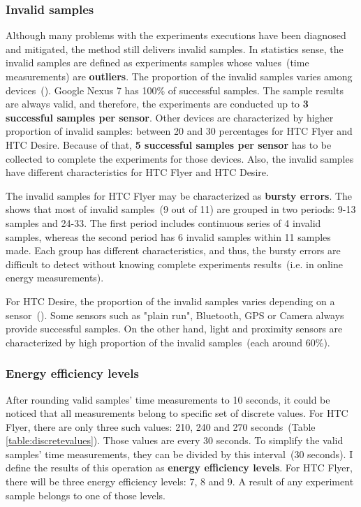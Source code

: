 \subsubsection{Invalid samples}
\hspace{10pt} Although many problems with the experiments executions have been diagnosed and mitigated, the method still delivers invalid samples. In statistics sense, the invalid samples are defined as experiments samples whose values\ (time measurements) are \textbf{outliers}.  The proportion of the invalid samples varies among devices\ (). Google Nexus 7 has 100\% of successful samples. The sample results are always valid, and therefore, the experiments are conducted up to \textbf{3 successful samples per sensor}. Other devices are characterized by higher proportion of invalid samples: between 20 and 30 percentages for HTC Flyer and HTC Desire. Because of that, \textbf{5 successful samples per sensor} has to be collected to complete the experiments for those devices. Also, the invalid samples have different characteristics for HTC Flyer and HTC Desire. 

	
The invalid samples for HTC Flyer may be characterized as \textbf{bursty errors}. The  shows that most of invalid samples\ (9 out of 11) are grouped in two periods: 9-13 samples and 24-33. The first period includes continuous series of 4 invalid samples, whereas the second period has 6 invalid samples within 11 samples made. Each group has different characteristics, and thus, the bursty errors are difficult to detect without knowing complete experiments results\ (i.e. in online energy measurements).


For HTC Desire, the proportion of the invalid samples varies depending on a sensor\ (). Some sensors such as "plain run", Bluetooth, GPS or Camera always provide successful samples. On the other hand, light and proximity sensors are characterized by high proportion of the invalid samples\ (each around 60\%). 



\subsubsection{Energy efficiency levels}
\hspace{10pt} After rounding valid samples' time measurements to 10 seconds, it could be noticed that all measurements belong to specific set of discrete values. For HTC Flyer, there are only three such values: 210, 240 and 270 seconds\ (Table \ref{table:discretevalues}). Those values are every 30 seconds. To simplify the valid samples' time measurements, they can be divided by this interval\ (30 seconds). I define the results of this operation as \textbf{energy efficiency levels}. For HTC Flyer, there will be three energy efficiency levels: 7, 8 and 9. A result of any experiment sample belongs to one of those levels. 
			
